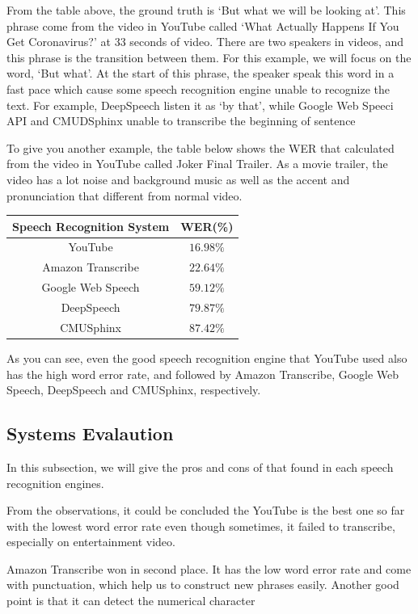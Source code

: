 \documentclass[natbib]{muthesis}
\begin{document}
 From the table above, the ground truth is `But what we will be looking at'. This phrase come from the video in YouTube called `What Actually Happens If You Get Coronavirus?' at 33 seconds of video. There are two speakers in videos, and this phrase is the transition between them. For this example, we will focus on the word, `But what'. At the start of this phrase, the speaker speak this word in a fast pace which cause some speech recognition engine unable to recognize the text. For example, DeepSpeech listen it as `by that', while Google Web Speeci API and CMUDSphinx unable to transcribe the beginning of sentence
 
 To give you another example, the table below shows the WER that calculated from the video in YouTube called Joker Final Trailer. As a movie trailer, the video has a lot noise and background music as well as the accent and pronunciation that different from normal video. 

 \begin{center}
 	\begin{tabular}{ |c|c| } 
 		\hline
 		Speech Recognition System & WER(\%)  \\ 
 		\hline
 		YouTube & $16.98\%$  \\ 
 		Amazon Transcribe & $22.64\%$  \\
 		Google Web Speech & $59.12\%$ \\
 		DeepSpeech & $79.87\%$\\
 		CMUSphinx & $87.42\%$ \\
 		\hline
 	\end{tabular}
 \end{center}

 As you can see, even the good speech recognition engine that YouTube used also has the high word error rate, and followed by Amazon Transcribe, Google Web Speech, DeepSpeech and CMUSphinx, respectively.
 
 \subsection{Systems Evalaution}
 In this subsection, we will give the pros and cons of that found in each speech recognition engines. 
 
 From the observations, it could be concluded the YouTube is the best one so far with the lowest word error rate even though sometimes, it failed to transcribe, especially on entertainment video.
 
 Amazon Transcribe won in second place. It has the low word error rate and come with punctuation, which help us to construct new phrases easily. Another good point is that it can detect the numerical character
 
\end{document}

